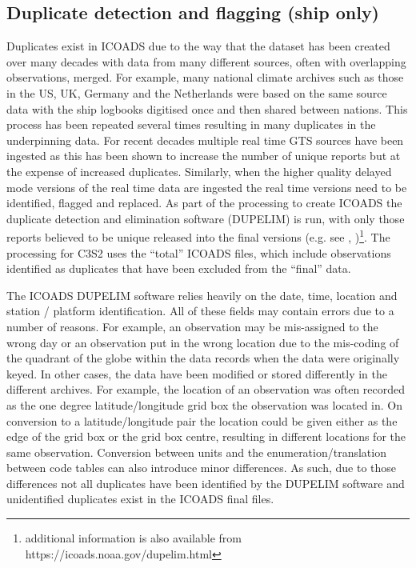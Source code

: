 \subsection{Duplicate detection and flagging (ship only)} \label{ship-dupelim}
Duplicates exist in ICOADS due to the way that the dataset has been created over many decades with data from many different sources, often with overlapping observations, merged. 
For example, many national climate archives such as those in the US, UK, Germany and the Netherlands were based on the same source data with the ship logbooks digitised once and then shared between nations. 
This process has been repeated several times resulting in many duplicates in the underpinning data. 
For recent decades multiple real time GTS sources have been ingested as this has been shown to increase the number of unique reports but at the expense of increased duplicates. 
Similarly, when the higher quality delayed mode versions of the real time data are ingested the real time versions need to be identified, flagged and replaced. 
As part of the processing to create ICOADS the duplicate detection and elimination software (DUPELIM) is run, with only those reports believed to be unique released into the final versions (e.g. see \cite{Freeman2017}, \cite{Woodruff2011})\footnote{additional information is also available from https://icoads.noaa.gov/dupelim.html}. The processing for C3S2 uses the ``total'' ICOADS files, which include observations identified as duplicates that have been excluded from the ``final'' data.

The ICOADS DUPELIM software relies heavily on the date, time, location and station / platform identification. 
All of these fields may contain errors due to a number of reasons. 
For example, an observation may be mis-assigned to the wrong day or an observation put in the wrong location due to the mis-coding of the quadrant of the globe within the data records when the data were originally keyed. 
In other cases, the data have been modified or stored differently in the different archives.
For example, the location of an observation was often recorded as the one degree latitude/longitude grid box the observation was located in.
On conversion to a latitude/longitude pair the location could be given either as the edge of the grid box or the grid box centre, resulting in different locations for the same observation.
Conversion between units and the enumeration/translation between code tables can also introduce minor differences.
As such, due to those differences not all duplicates have been identified by the DUPELIM software and unidentified duplicates exist in the ICOADS final files.


